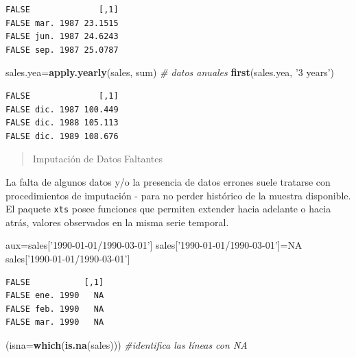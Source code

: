 \documentclass[]{book}
\newenvironment{Shaded}{\begin{snugshade}}{\end{snugshade}}
\newcommand{\CommentTok}[1]{\textcolor[rgb]{0.56,0.35,0.01}{\textit{#1}}}
\newcommand{\DataTypeTok}[1]{\textcolor[rgb]{0.13,0.29,0.53}{#1}}
\newcommand{\KeywordTok}[1]{\textcolor[rgb]{0.13,0.29,0.53}{\textbf{#1}}}
\newcommand{\NormalTok}[1]{#1}
\newcommand{\OtherTok}[1]{\textcolor[rgb]{0.56,0.35,0.01}{#1}}
\newcommand{\StringTok}[1]{\textcolor[rgb]{0.31,0.60,0.02}{#1}}
\begin{document}
\begin{verbatim}
FALSE              [,1]
FALSE mar. 1987 23.1515
FALSE jun. 1987 24.6243
FALSE sep. 1987 25.0787
\end{verbatim}

\begin{Shaded}
\begin{Highlighting}[]
\NormalTok{sales.yea=}\KeywordTok{apply.yearly}\NormalTok{(sales, sum) }\CommentTok{# datos anuales}
 \KeywordTok{first}\NormalTok{(sales.yea, }\StringTok{'3 years'}\NormalTok{)}
\end{Highlighting}
\end{Shaded}

\begin{verbatim}
FALSE              [,1]
FALSE dic. 1987 100.449
FALSE dic. 1988 105.113
FALSE dic. 1989 108.676
\end{verbatim}

\begin{quote}
Imputación de Datos Faltantes
\end{quote}

La falta de algunos datos y/o la presencia de datos errones suele tratarse con procedimientos de imputación - para no perder histórico de la muestra disponible. El paquete \texttt{xts} posee funciones que permiten extender hacia adelante o hacia atrás, valores observados en la misma serie temporal.

\begin{Shaded}
\begin{Highlighting}[]
\NormalTok{aux=sales[}\StringTok{'1990-01-01/1990-03-01'}\NormalTok{]}
\NormalTok{sales[}\StringTok{'1990-01-01/1990-03-01'}\NormalTok{]=}\OtherTok{NA}
\NormalTok{sales[}\StringTok{'1990-01-01/1990-03-01'}\NormalTok{]}
\end{Highlighting}
\end{Shaded}

\begin{verbatim}
FALSE           [,1]
FALSE ene. 1990   NA
FALSE feb. 1990   NA
FALSE mar. 1990   NA
\end{verbatim}

\begin{Shaded}
\begin{Highlighting}[]
\NormalTok{(}\DataTypeTok{isna=}\KeywordTok{which}\NormalTok{(}\KeywordTok{is.na}\NormalTok{(sales))) }\CommentTok{#identifica las líneas con NA}
\end{Highlighting}
\end{Shaded}
\end{document}
